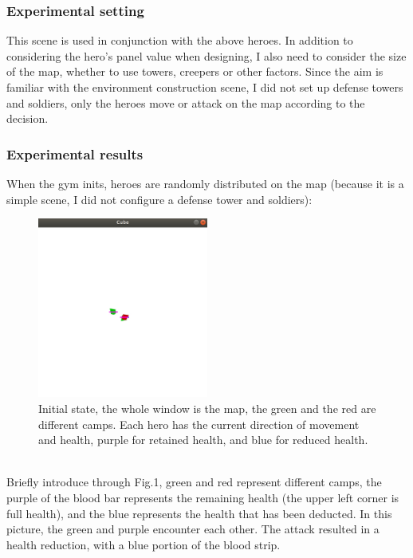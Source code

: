 \documentclass[runningheads]{llncs}
\begin{document}
\subsubsection{Experimental setting} This scene is used in conjunction with the above heroes. In addition to considering the hero's panel value when designing, I also need to consider the size of the map, whether to use towers, creepers or other factors. Since the aim is familiar with the environment construction scene, I did not set up defense towers and soldiers, only the heroes move or attack on the map according to the decision.


\subsubsection{Experimental results}

When the gym inits, heroes are randomly distributed on the map (because it is a simple scene, I did not configure a defense tower and soldiers):\\
\begin{figure}
	\centering
	\includegraphics[width=0.50\textwidth]{1.jpg}
	\caption{Initial state, the whole window is the map, the green and the red are different camps. Each hero has the current direction of movement and health, purple for retained health, and blue for reduced health.}
\end{figure}
\\
Briefly introduce through Fig.1, green and red represent different camps, the purple of the blood bar represents the remaining health (the upper left corner is full health), and the blue represents the health that has been deducted. In this picture, the green and purple encounter each other. The attack resulted in a health reduction, with a blue portion of the blood strip.
\end{document}
